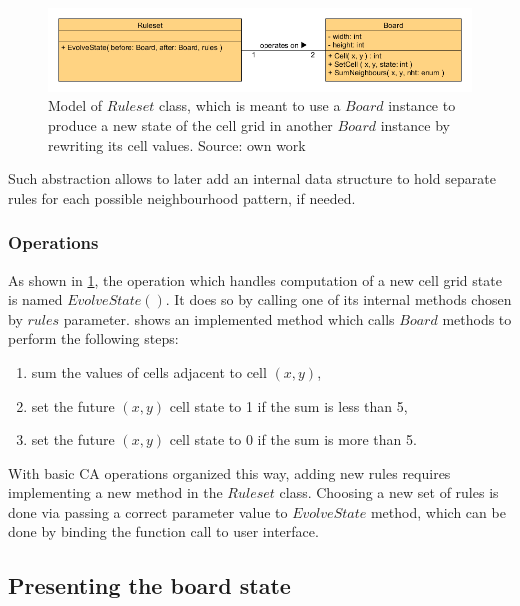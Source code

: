 \documentclass[12pt]{report}
\begin{document}
\begin{figure}[h]
	\centering
	\includegraphics[width=0.9\linewidth]{diagrams/ruleset-board}
	\caption{Model of $Ruleset$ class, which is meant to use a $Board$ instance to produce a new state of the cell grid in another $Board$ instance by rewriting its cell values. Source: own work}
	\label{fig:ruleset-board}
\end{figure}

Such abstraction allows to later add an internal data structure to hold separate rules for each possible neighbourhood pattern, if needed. 

\subsubsection{Operations}

As shown in \cref{fig:ruleset-board}, the operation which handles computation of a new cell grid state is named $EvolveState()$. It does so by calling one of its internal methods chosen by $rules$ parameter.  shows an implemented method which calls $Board$ methods to perform the following steps:

\begin{enumerate}
	\item sum the values of cells adjacent to cell $(x,y)$,
	\item set the future $(x,y)$ cell state to 1 if the sum is less than 5,
	\item set the future $(x,y)$ cell state to 0 if the sum is more than 5.
\end{enumerate}




With basic CA operations organized this way, adding new rules requires implementing a new method in the $Ruleset$ class. Choosing a new set of rules is done via passing a correct parameter value to $EvolveState$ method, which can be done by binding the function call to user interface.

\subsection{Presenting the board state}
\end{document}
